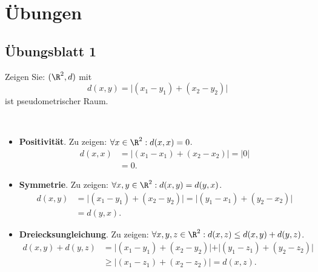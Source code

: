 \chapter{Übungen}



% 
\section{Übungsblatt 1}
\setcounter{problemcounter}{0}

\begin{assignment}
  Zeigen Sie: \( (\R^2, d) \) mit
  \begin{equation*}
    d(x,y) = \vert (x_1-y_1)+(x_2-y_2) \vert
  \end{equation*}
  ist pseudometrischer Raum.
\end{assignment}
\begin{solution}
  \
  \begin{itemize}
    \item \textbf{Positivität}. Zu zeigen: \( \forall x \in \R^2: d(x,x) = 0 \).
    \begin{align*}
      d(x,x) &= \vert (x_1-x_1)+(x_2-x_2) \vert = \vert 0 \vert \\
      &= 0\text{.}
    \end{align*}

    \item \textbf{Symmetrie}. Zu zeigen: \( \forall x, y \in \R^2: d(x,y) = d(y,x) \).
    \begin{align*}
      d(x,y) &= \vert (x_1-y_1)+(x_2-y_2) \vert = \vert (y_1-x_1)+(y_2-x_2) \vert \\
        &= d(y,x)\text{.}
    \end{align*}
    
    \item \textbf{Dreiecksungleichung}. Zu zeigen: \( \forall x,y,z \in \R^2: d(x,z) \leq d(x,y) + d(y,z) \).
    \begin{align*}
      d(x,y) + d(y,z) &= \vert (x_1-y_1)+(x_2-y_2) \vert + \vert (y_1-z_1)+(y_2-z_2) \vert \\
        &\geq \vert (x_1-z_1) + (x_2 - z_2) \vert = d(x,z)\text{.}
    \end{align*}
  \end{itemize}
\end{solution}

